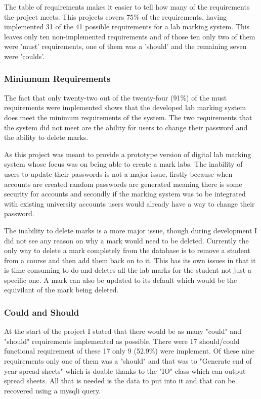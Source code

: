 \documentclass[12pt]{article}  %
\begin{document}
The table of requirements makes it easier to tell how many of the requirements the project meets. This projects covers 75\% of the requirements, having implemented 31 of the 41 possible requirements for a lab marking system. This leaves only ten non-implemented requirements and of those ten only two of them were 'must' requirements, one of them was a 'should' and the remaining seven were 'coulds'.

\subsubsection*{Miniumum Requirements}

The fact that only twenty-two out of the twenty-four (91\%) of the  must requirements were  implemented shows that the developed lab marking system does meet the minimum requirements of the system. The two requirements that the system did not meet are the ability for users to change their password and the ability to delete marks.

As this project was meant to provide a prototype version of digital lab marking system whose focus was on being able to create a mark labs. The inability of users to update their passwords is not a major issue, firstly because when accounts are created random passwords are generated meaning there is some security for accounts and secondly if the marking system was to be integrated with existing university accounts users would already have a way to change their password.

The inability to delete marks is a more major issue, though during development I did not see any reason on why a mark would need to be deleted. Currently the only way to delete a mark completely from the database is to remove a student from a course and then add them back on to it. This has its own issues in that it is time consuming to do and deletes all the lab marks for the student not just a specific one. A mark can also be updated to its default which would be the equivilant of the mark being deleted.

\subsubsection*{Could and Should}

At the start of the project I stated that there would be as many "could" and "should" requirements implemented as possible. There were 17 should/could functional requirement of these 17 only 9 (52.9\%) were implement. Of these nine requirements only one of them was a "should" and that was to "Generate end of year spread sheets" which is doable thanks to the "IO" class which can output spread sheets. All that is needed is the data to put into it and that can be recovered using a mysqli query.    
\end{document}

